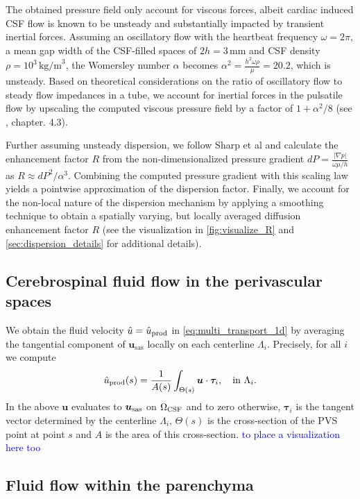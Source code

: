 \documentclass[fleqn,10pt]{wlscirep}
\newcommand{\rami}[1]{\textcolor{blue}{#1}}
\begin{document}
The obtained pressure field only account for viscous forces, albeit cardiac induced CSF flow is known to be unsteady and substantially impacted by transient inertial forces. Assuming an oscillatory flow with the heartbeat frequency $\omega = 2 \pi$, a mean gap width of the CSF-filled spaces of $2h=3$\,mm and CSF density $\rho=10^3\,\text{kg/m}^3$, the Womersley number $\alpha$ becomes $\alpha^2 = \frac{h^2 \omega \rho}{\mu} = 20.2$, which is unsteady. Based on theoretical considerations on the ratio of oscillatory flow to steady flow impedances in a tube, we account for inertial forces in the pulsatile flow by upscaling the computed viscous pressure field by a factor of $1 + \alpha^2 / 8$ (see \cite{van1998cardiovascular}, chapter. 4.3).

Further assuming unsteady dispersion, we follow Sharp et al \cite{keith2019dispersion} and calculate the enhancement factor $R$ from the non-dimensionalized pressure gradient $dP=\frac{|\nabla p|}{\omega \mu / h}$ as $R\approx dP^2 / \alpha^3$. Combining the computed pressure gradient with this scaling law yields a pointwise approximation of the dispersion factor. Finally, we account for the non-local nature of the dispersion mechanism by applying a smoothing technique to obtain a spatially varying, but locally averaged diffusion enhancement factor $R$ (see the visualization in \cref{fig:visualize_R} and \cref{sec:dispersion_details} for additional details).


\subsection*{Cerebrospinal fluid flow in the perivascular spaces}
\label{sec:csf_pvs}
We obtain the fluid velocity $\hat u = \hat u_{\rm prod}$  in \eqref{eq:multi_transport_1d} by averaging the tangential component of $\bm u_{\mathrm{sas}}$ locally on each centerline $\Lambda_i$. Precisely, for all $i$ we compute 
\begin{equation}
\hat u_{\rm {prod}}(s) = \frac{1}{A(s)} \int_{\Theta(s)} \bm u \cdot \bm \tau_i, \quad \mathrm{in} \,\,  \Lambda_i.   
\end{equation}
 In the above $\bm u$ evaluates to $\bm u_{\rm{sas}}$ on $\Omega_{\rm CSF}$ and to zero otherwise, $\bm \tau_i$ is the tangent vector determined by the centerline $\Lambda_i$, $\Theta(s)$ is the cross-section of the PVS point at point $s$ and  $A$ is the area of this cross-section. \rami{to place a visualization here too }

\subsection*{Fluid flow within the parenchyma}
\label{sec:csf_brain}
\end{document}
